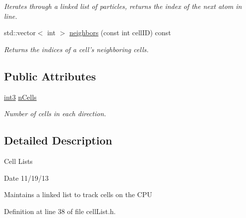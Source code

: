 \begin{DoxyCompactItemize}
\begin{DoxyCompactList}\small\item\em Iterates through a linked list of particles, returns the index of the next atom in line. \end{DoxyCompactList}\item 
\hypertarget{classcell_list__cpu_aeaf165c887b13bfa7f7c1a8b70102aff}{std\-::vector$<$ int $>$ \hyperlink{classcell_list__cpu_aeaf165c887b13bfa7f7c1a8b70102aff}{neighbors} (const int cell\-I\-D) const }\label{classcell_list__cpu_aeaf165c887b13bfa7f7c1a8b70102aff}

\begin{DoxyCompactList}\small\item\em Returns the indices of a cell's neighboring cells. \end{DoxyCompactList}\end{DoxyCompactItemize}
\subsection*{Public Attributes}
\begin{DoxyCompactItemize}
\item 
\hypertarget{classcell_list__cpu_ae86e1c9604a39bc8a493fa0f6538fd37}{\hyperlink{structint3}{int3} \hyperlink{classcell_list__cpu_ae86e1c9604a39bc8a493fa0f6538fd37}{n\-Cells}}\label{classcell_list__cpu_ae86e1c9604a39bc8a493fa0f6538fd37}

\begin{DoxyCompactList}\small\item\em Number of cells in each direction. \end{DoxyCompactList}\end{DoxyCompactItemize}


\subsection{Detailed Description}
Cell Lists \begin{DoxyDate}{Date}
11/19/13
\end{DoxyDate}
Maintains a linked list to track cells on the C\-P\-U 

Definition at line 38 of file cell\-List.\-h.



